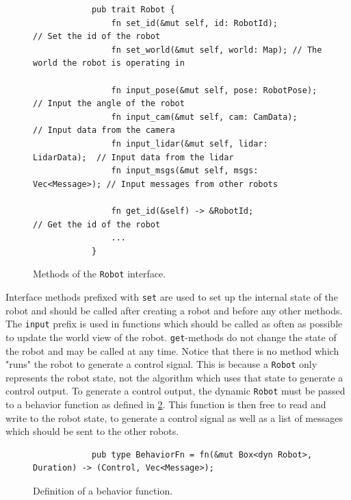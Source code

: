 \begin{figure}[H]
    \begin{center}
        \begin{verbatim}
            pub trait Robot {
                fn set_id(&mut self, id: RobotId);            // Set the id of the robot
                fn set_world(&mut self, world: Map); // The world the robot is operating in

                fn input_pose(&mut self, pose: RobotPose);    // Input the angle of the robot
                fn input_cam(&mut self, cam: CamData);        // Input data from the camera
                fn input_lidar(&mut self, lidar: LidarData);  // Input data from the lidar
                fn input_msgs(&mut self, msgs: Vec<Message>); // Input messages from other robots

                fn get_id(&self) -> &RobotId;                 // Get the id of the robot
                ...
            }
        \end{verbatim}
    \end{center}
    \caption{Methods of the \texttt{Robot} interface.}\label{fig:robot-interface}
\end{figure}

Interface methods prefixed with \texttt{set} are used to set up the internal state of the robot and should be called after creating a robot and before any other methods. The \texttt{input} prefix is used in functions which should be called as often as possible to update the world view of the robot. \texttt{get}-methods do not change the state of the robot and may be called at any time. Notice that there is no method which "runs" the robot to generate a control signal. This is because a \texttt{Robot} only represents the robot state, not the algorithm which uses that state to generate a control output. To generate a control output, the dynamic \texttt{Robot} must be passed to a behavior function as defined in \cref{fig:behavior-fn}. This function is then free to read and write to the robot state, to generate a control signal as well as a list of messages which should be sent to the other robots.

\begin{figure}[H]
    \begin{center}
        \begin{verbatim}
            pub type BehaviorFn = fn(&mut Box<dyn Robot>, Duration) -> (Control, Vec<Message>);
        \end{verbatim}
    \end{center}
    \caption{Definition of a behavior function.}\label{fig:behavior-fn}
\end{figure}

